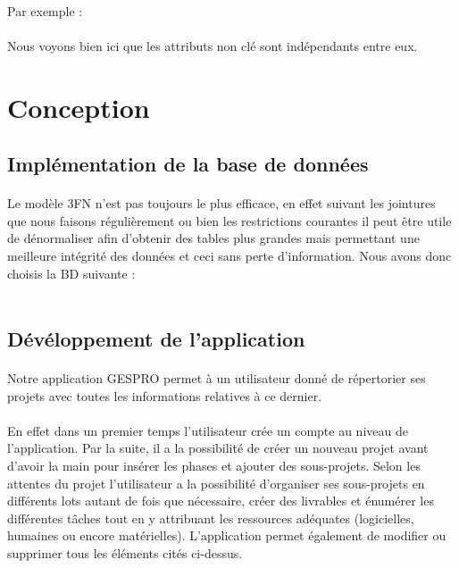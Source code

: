 \documentclass[a4paper, 12pt]{article}
\begin{document}
\paragraph{}Par exemple :

\paragraph{}Nous voyons bien ici que les attributs non clé sont indépendants entre eux.

\newpage

\section{Conception}
\subsection{Implémentation de la base de données}
\paragraph{}Le modèle 3FN n'est pas toujours le plus efficace, en effet suivant les jointures que nous faisons régulièrement ou bien les restrictions courantes il peut être utile de dénormaliser afin d'obtenir des tables plus grandes mais permettant une meilleure intégrité des données et ceci sans perte d'information. Nous avons donc choisis la BD suivante :
\\ \\

\newpage
\subsection{Dévéloppement de l'application}
\paragraph{}Notre application GESPRO permet à un utilisateur donné de répertorier ses projets avec toutes les informations relatives à ce dernier.
\paragraph{}En effet dans un premier temps l’utilisateur crée un compte au niveau de l’application. Par la suite, il a la possibilité de créer un nouveau projet avant d’avoir la main pour insérer les phases et ajouter des sous-projets. Selon les attentes du projet l’utilisateur a la possibilité d’organiser ses sous-projets en différents lots autant de fois que nécessaire,  créer des livrables et énumérer les différentes tâches tout en y attribuant les ressources adéquates (logicielles, humaines ou encore matérielles). L’application permet également de modifier ou supprimer tous les éléments cités ci-dessus. 
\end{document}
